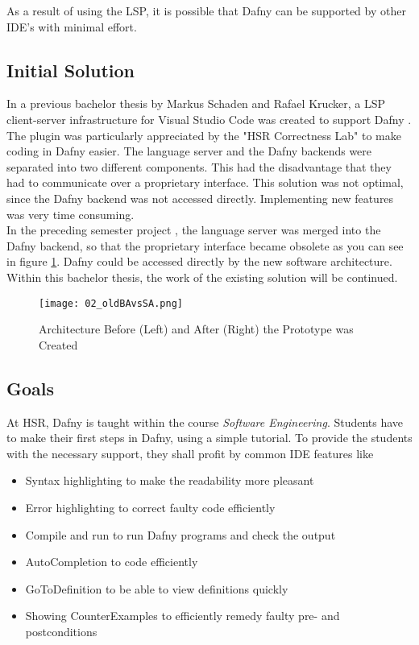 As a result of using the LSP, it is possible that Dafny can be supported by other IDE's with minimal effort.

\subsection{Initial Solution}
\label{section:management_summary:initialsolution}
In a previous bachelor thesis by Markus Schaden and Rafael Krucker, a LSP client-server infrastructure for Visual Studio Code was created to support Dafny \cite{ba}.
The plugin was particularly appreciated by the "HSR Correctness Lab" \cite{correctnessLab} to make coding in Dafny easier.
The language server and the Dafny backends were separated into two different components.
This had the disadvantage that they had to communicate over a proprietary interface.
This solution was not optimal, since the Dafny backend was not accessed directly.
Implementing new features was very time consuming. \\

In the preceding semester project \cite{sa}, the language server was merged into the Dafny backend, so that the proprietary interface became obsolete as you can see in figure \ref{fig:oldBAvsSA}.
Dafny could be accessed directly by the new software architecture.
Within this bachelor thesis, the work of the existing solution will be continued.

\begin{figure}[H]
    \centering
    \texttt{[image: 02\_oldBAvsSA.png]}
    \caption{Architecture Before (Left) and After (Right) the Prototype was Created}
    \label{fig:oldBAvsSA}
\end{figure}

\subsection{Goals}
At HSR, Dafny is taught within the course \textit{Software Engineering}.
Students have to make their first steps in Dafny, using a simple tutorial.
To provide the students with the necessary support, they shall profit by common IDE features like
\begin{itemize}
    \item Syntax highlighting to make the readability more pleasant
    \item Error highlighting to correct faulty code efficiently
    \item Compile and run to run Dafny programs and check the output
    \item AutoCompletion to code efficiently
    \item GoToDefinition to be able to view definitions quickly
    \item Showing CounterExamples to efficiently remedy faulty pre- and postconditions
\end{itemize}

